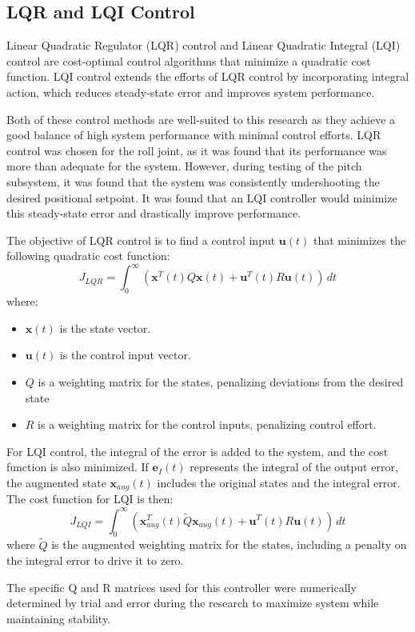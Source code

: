 \subsection{LQR and LQI Control}

Linear Quadratic Regulator (LQR) control and Linear Quadratic Integral (LQI) control are cost-optimal control algorithms that minimize a quadratic cost function. LQI control extends the efforts of LQR control by incorporating integral action, which reduces steady-state error and improves system performance.

Both of these control methods are well-suited to this research as they achieve a good balance of high system performance with minimal control efforts. LQR control was chosen for the roll joint, as it was found that its performance was more than adequate for the system. However, during testing of the pitch subsystem, it was found that the system was consistently undershooting the desired positional setpoint. It was found that an LQI controller would minimize this steady-state error and drastically improve performance.

The objective of LQR control is to find a control input $\mathbf{u}(t)$ that minimizes the following quadratic cost function:
$$ J_{LQR} = \int_{0}^{\infty} (\mathbf{x}^T(t) Q \mathbf{x}(t) + \mathbf{u}^T(t) R \mathbf{u}(t)) \, dt $$
where:
\begin{itemize}
    \item $\mathbf{x}(t)$ is the state vector.
    \item $\mathbf{u}(t)$ is the control input vector.
    \item $Q$ is a weighting matrix for the states, penalizing deviations from the desired state
    \item $R$ is a weighting matrix for the control inputs, penalizing control effort.
\end{itemize}

For LQI control, the integral of the error is added to the system, and the cost function is also minimized. If $\mathbf{e}_I(t)$ represents the integral of the output error, the augmented state $\mathbf{x}_{aug}(t)$ includes the original states and the integral error. The cost function for LQI is then:
$$ J_{LQI} = \int_{0}^{\infty} (\mathbf{x}_{aug}^T(t) \tilde{Q} \mathbf{x}_{aug}(t) + \mathbf{u}^T(t) R \mathbf{u}(t)) \, dt $$
where $\tilde{Q}$ is the augmented weighting matrix for the states, including a penalty on the integral error to drive it to zero.

The specific Q and R matrices used for this controller were numerically determined by trial and error during the research to maximize system while maintaining stability. 

